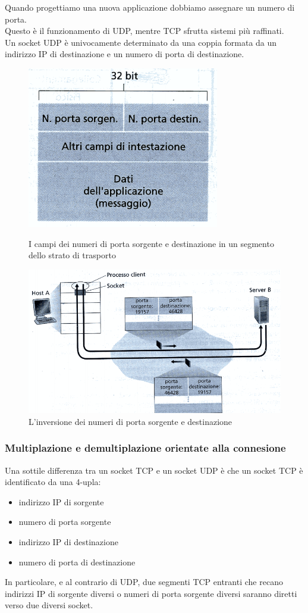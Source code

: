 \documentclass[11pt,a4paper]{article}
\begin{document}
Quando progettiamo una nuova applicazione dobbiamo assegnare un numero di porta. \\
Questo è il funzionamento di UDP, mentre TCP sfrutta sistemi più raffinati. \\
Un socket UDP è univocamente determinato da una coppia formata da un indirizzo IP di destinazione e un numero di porta di destinazione.


\begin{figure}
	\begin{center}
		\includegraphics[scale=1]{img/011.png}
		\caption{I campi dei numeri di porta sorgente e destinazione in un segmento dello strato di trasporto} 
	\end{center}
	\includegraphics[scale=0.6]{img/012.png}
	\caption{L'inversione dei numeri di porta sorgente e destinazione}
\end{figure}


\subsubsection{Multiplazione e demultiplazione orientate alla connesione}
Una sottile differenza tra un socket TCP e un socket UDP è che un socket TCP è identificato da una 4-upla:
\begin{itemize}
	\item indirizzo IP di sorgente
	\item numero di porta sorgente
	\item indirizzo IP di destinazione
	\item numero di porta di destinazione
\end{itemize}
In particolare, e al contrario di UDP, due segmenti TCP entranti che recano indirizzi IP di sorgente diversi o numeri di porta sorgente diversi saranno diretti verso due diversi socket. \\
\end{document}
